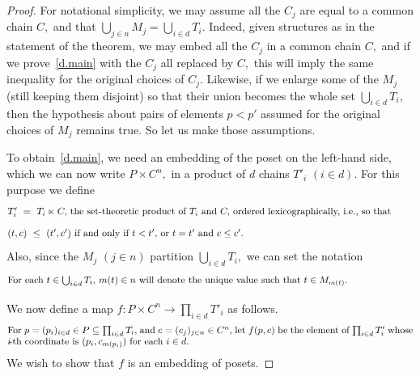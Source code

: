 \documentclass{amsart}
\numberwithin{equation}{section}
\numberwithin{theorem}{section}
\newcommand{\2}{\mathbf{2}}
\begin{document}
\begin{proof}
For notational simplicity, we may assume all the $C_j$ are equal
to a common chain $C,$ and that
$\bigcup_{j\in n} M_j = \bigcup_{i\in d} T_i.$
Indeed, given structures as in the statement of the theorem,
we may embed all the $C_j$ in a common chain $C,$ and if we
prove~\eqref{d.main} with the $C_j$ all replaced by $C,$
this will imply the same inequality for the original
choices of $C_j.$
Likewise, if we enlarge some of the $M_j$
(still keeping them disjoint) so that their
union becomes the whole set $\bigcup_{i\in d} T_i,$
then the hypothesis about pairs of elements $p<p'$ assumed
for the original choices of $M_j$ remains true.
So let us make those assumptions.

To obtain~\eqref{d.main}, we need an embedding of the poset
on the left-hand side, which we can now write
$P\times C^n,$ in a product of $d$ chains $T'_i$ $(i\in d).$
For this purpose we define
%
\begin{equation}\begin{minipage}[c]{35pc}\label{d.T'}
$T'_i\ =\ T_i\ltimes C,$ the set-theoretic product
of $T_i$ and $C,$ ordered lexicographically, i.e., so that
\end{minipage}\end{equation}
%
\begin{equation}\begin{minipage}[c]{35pc}\label{d.lex}
$(t,c)\ \leq\ (t',c')$ if and only if
$t<t',$ or $t=t'$ and $c\leq c'.$
\end{minipage}\end{equation}
%
Also, since the $M_j$ $(j\in n)$ partition
$\bigcup_{i\in d} T_i,$ we can set the notation
%
\begin{equation}\begin{minipage}[c]{35pc}\label{d.mu}
For each $t\in\bigcup_{i\in d} T_i,$ $m(t)\in n$ will denote the
unique value such that $t\in M_{m(t)}.$
\end{minipage}\end{equation}

We now define a map $f: P\times C^n \to \prod_{i\in d} T'_i$ as follows.
%
\begin{equation}\begin{minipage}[c]{35pc}\label{d.f}
For $p=(p_i)_{i\in d}\in P \subseteq\prod_{i\in d} T_i,$
and $c=(c_j)_{j\in n}\in C^n,$ let
$f(p,c)$ be the element of $\prod_{i\in d} T'_i$ whose
$\!i\!$-th coordinate is $(p_i,c_{m(p_i)})$ for each $i\in d.$
\end{minipage}\end{equation}
%
We wish to show that $f$ is an embedding of posets.


\end{proof}
\end{document}
